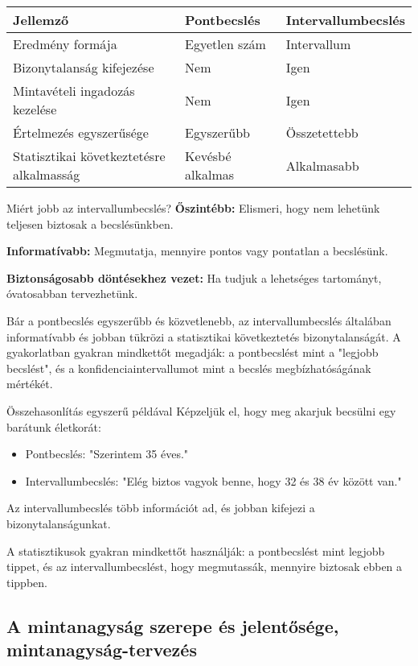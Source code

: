 \documentclass[a4paper,12pt]{article}
\begin{document}
    \begin{tabular}{|l|l|l|}
        \hline
        Jellemző                                 & Pontbecslés      & Intervallumbecslés \\
        \hline
        Eredmény formája                         & Egyetlen szám    & Intervallum        \\
        Bizonytalanság kifejezése                & Nem              & Igen               \\
        Mintavételi ingadozás kezelése           & Nem              & Igen               \\
        Értelmezés egyszerűsége                  & Egyszerűbb       & Összetettebb       \\
        Statisztikai következtetésre alkalmasság & Kevésbé alkalmas & Alkalmasabb        \\
        \hline
    \end{tabular}

    Miért jobb az intervallumbecslés?
    \textbf{Őszintébb:} Elismeri, hogy nem lehetünk teljesen biztosak a becslésünkben.

    \textbf{Informatívabb:} Megmutatja, mennyire pontos vagy pontatlan a becslésünk.

    \textbf{Biztonságosabb döntésekhez vezet:} Ha tudjuk a lehetséges tartományt, óvatosabban tervezhetünk.


    Bár a pontbecslés egyszerűbb és közvetlenebb, az intervallumbecslés általában informatívabb és jobban tükrözi a statisztikai következtetés bizonytalanságát. A gyakorlatban gyakran mindkettőt megadják: a pontbecslést mint a "legjobb becslést", és a konfidenciaintervallumot mint a becslés megbízhatóságának mértékét.

    Összehasonlítás egyszerű példával
    Képzeljük el, hogy meg akarjuk becsülni egy barátunk életkorát:
    \begin{itemize}
        \item Pontbecslés: "Szerintem 35 éves."
        \item Intervallumbecslés: "Elég biztos vagyok benne, hogy 32 és 38 év között van."
    \end{itemize}
    Az intervallumbecslés több információt ad, és jobban kifejezi a bizonytalanságunkat.

    A statisztikusok gyakran mindkettőt használják: a pontbecslést mint legjobb tippet, és az intervallumbecslést, hogy megmutassák, mennyire biztosak ebben a tippben.

    \subsection{A mintanagyság szerepe és jelentősége, mintanagyság-tervezés}
\end{document}
